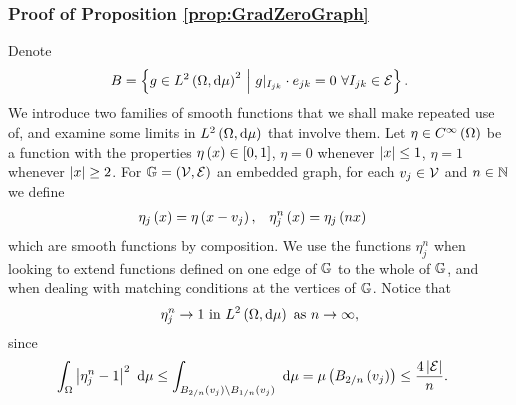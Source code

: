 \subsubsection{Proof of Proposition \ref{prop:GradZeroGraph}} \label{appS:ProofOfGradZeroChar}
Denote 
\begin{align*}
	B = \left\{ g\in L^{2}\left( \Omega,\mathrm{d}\mu \right)^2 \ \middle\vert \  g\vert_{I_{jk}}\cdot e_{jk}=0 \ \forall I_{jk}\in \mathcal{E} \right\}.
\end{align*}
We introduce two families of smooth functions that we shall make repeated use of, and examine some limits in $L^{2}\left( \Omega,\mathrm{d}\mu \right)$ that involve them.
Let $\eta\in C^{\infty}\left( \Omega \right)$ be a function with the properties $\eta\left( x \right)\in [0,1]$, $\eta = 0$ whenever $\left\lvert x \right\rvert\leq 1$, $\eta = 1$ whenever $\left\lvert x \right\rvert\geq 2$.
For $\mathbb{G}=\left( \mathcal{V},\mathcal{E} \right)$ an embedded graph, for each $v_j\in \mathcal{V}$ and $n\in\mathbb{N}$ we define
\begin{align} \label{eq:etaDef}
	\eta_j\left( x \right) = \eta\left( x-v_j \right), &\quad \eta_j^n\left( x \right) = \eta_j\left( nx \right)
\end{align}
which are smooth functions by composition.
We use the functions $\eta_j^n$ when looking to extend functions defined on one edge of $\mathbb{G}$ to the whole of $\mathbb{G}$, and when dealing with matching conditions at the vertices of $\mathbb{G}$.
Notice that
\begin{align*}
	\eta_j^n \rightarrow 1 \text{ in } L^{2}\left( \Omega,\mathrm{d}\mu \right) \ \text{as} \ n \rightarrow\infty,
\end{align*}
since
\begin{align*}
	\int_{\Omega}\left\lvert \eta_j^n-1 \right\rvert^2 \ \mathrm{d}\mu 
	&\leq \int_{B_{2/n}\left( v_j \right) \setminus B_{1/n}\left( v_j \right)} \ \mathrm{d}\mu 
	= \mu\left( B_{2/n}\left( v_j \right) \right)
	\leq \frac{4 \left\lvert \mathcal{E} \right\rvert}{n}.
\end{align*}

